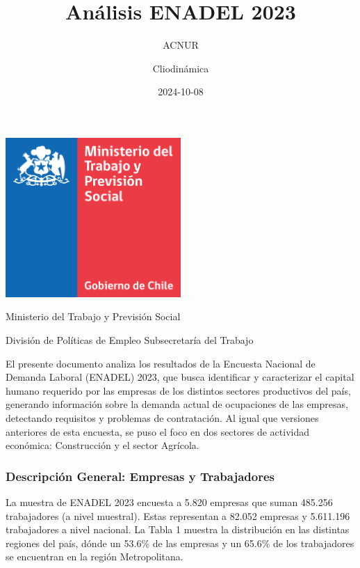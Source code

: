 \documentclass[
]{article}
\title{Análisis ENADEL 2023}
\subtitle{ACNUR}
\author{Cliodinámica}
\date{2024-10-08}
\begin{document}
\maketitle

\begin{titlingpage}
    \centering
    \includegraphics[width=0.5\textwidth]{Imagenes/color_MinTrabajo.png}
    \vspace{1cm} %

    \maketitle %

    \vspace{2cm} %
\end{titlingpage}

Ministerio del Trabajo y Previsión Social

División de Políticas de Empleo Subsecretaría del Trabajo

El presente documento analiza los resultados de la Encuesta Nacional de
Demanda Laboral (ENADEL) 2023, que busca identificar y caracterizar el
capital humano requerido por las empresas de los distintos sectores
productivos del país, generando información sobre la demanda actual de
ocupaciones de las empresas, detectando requisitos y problemas de
contratación. Al igual que versiones anteriores de esta encuesta, se
puso el foco en dos sectores de actividad económica: Construcción y el
sector Agrícola.

\subsubsection{Descripción General: Empresas y
Trabajadores}\label{descripciuxf3n-general-empresas-y-trabajadores}

La muestra de ENADEL 2023 encuesta a 5.820 empresas que suman 485.256
trabajadores (a nivel muestral). Estas representan a 82.052 empresas y
5.611.196 trabajadores a nivel nacional. La Tabla 1 muestra la
distribución en las distintas regiones del país, dónde un 53.6\% de las
empresas y un 65.6\% de los trabajadores se encuentran en la región
Metropolitana.
\end{document}
